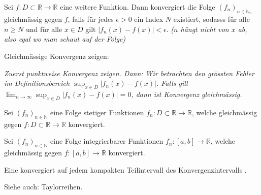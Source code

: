 Sei $f : D \subset \mathbb{R} \rightarrow \mathbb{R}$ eine weitere Funktion. Dann konvergiert die Folge $(f_n)_{n \in \mathbb{N}_0}$ gleichmässig gegen $f$, falls für jedes $\epsilon > 0$ ein Index $N$ existiert, sodasss für alle $n \geq N$ und für alle $x \in D$ gilt $|f_n(x) - f(x)|< \epsilon$.
\textit{($n$ hängt nicht von $x$ ab, also egal wo man schaut auf der Folge)}

\begin{exercise}
    Gleichmässige Konvergenz zeigen:

    \textit{Zuerst punktweise Konvergenz zeigen. Dann: Wir betrachten den grössten Fehler im Definitionsbereich $\sup_{x \in D} |f_n(x)-f(x)|$. Falls gilt $\lim_{n \rightarrow \infty} \sup_{x \in D} |f_n(x)-f(x)|=0$, dann ist Konvergenz gleichmässig.}
\end{exercise}

Sei $(f_n)_{n \in \mathbb{N}}$ eine Folge stetiger Funktionen $f_n : D \subset \mathbb{R} \to \mathbb{R}$, welche gleichmässig gegen $f : D \subset \mathbb{R} \to \mathbb{R}$ konvergiert. 

Sei $(f_n)_{n \in \mathbb{N}}$ eine Folge integrierbarer Funktionen $f_n : [a,b] \to \mathbb{R}$, welche gleichmässig gegen $f : [a,b] \to \mathbb{R}$ konvergiert. 

Eine  konvergiert auf jedem kompakten Teilintervall des Konvergenzintervalls .

Siehe auch: Taylorreihen.